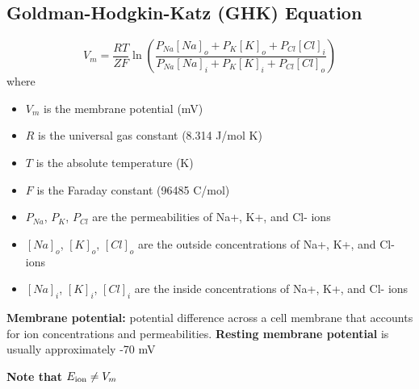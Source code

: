 \documentclass[11pt,fleqn]{book}
\begin{document}
\subsection{Goldman-Hodgkin-Katz (GHK) Equation} 
\begin{theorem}
    $$V_m = \frac{RT}{ZF} \ln \left(\frac{P_{Na}[Na]_o + P_K[K]_o + P_{Cl}[Cl]_i}{P_{Na}[Na]_i + P_K[K]_i + P_{Cl}[Cl]_o} \right)$$
    where
    \begin{itemize}
      \item $V_m$ is the membrane potential (mV)
      \item $R$ is the universal gas constant (8.314 J/mol K)
      \item $T$ is the absolute temperature (K)  
      \item $F$ is the Faraday constant (96485 C/mol)
      \item $P_{Na}$, $P_K$, $P_{Cl}$ are the permeabilities of Na+, K+, and Cl- ions
      \item $[Na]_o$, $[K]_o$, $[Cl]_o$ are the outside concentrations of Na+, K+, and Cl- ions
      \item $[Na]_i$, $[K]_i$, $[Cl]_i$ are the inside concentrations of Na+, K+, and Cl- ions
    \end{itemize}
    \textbf{Membrane potential:} potential difference across a cell membrane that accounts for ion concentrations and permeabilities. \textbf{Resting membrane potential} is usually approximately -70 mV
\end{theorem} 
\begin{remark}
    \textbf{Note that} $E_{\rm ion}\neq V_m$
\end{remark}
\end{document}
